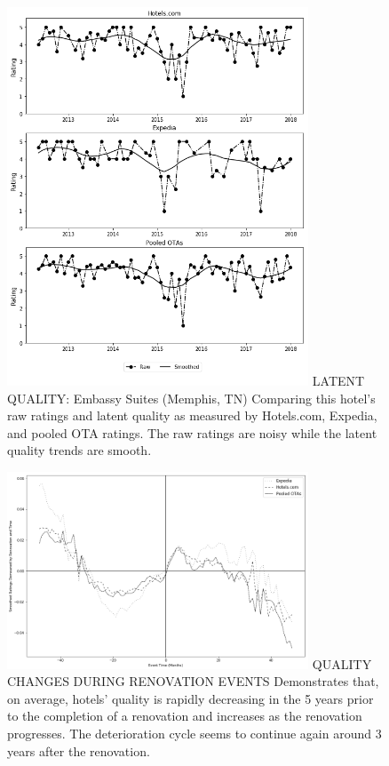 \documentclass{informs_mod} %
\begin{document}
\begin{figure}[htp]
\FIGURE
{\includegraphics[width=0.8\textwidth,height=\textheight,keepaspectratio]{./Figures/Smoothed_Qual_18987_v2.png}}
{LATENT QUALITY: Embassy Suites (Memphis, TN) \label{fig:latentqual}}
{Comparing this hotel's raw ratings and latent quality as measured by  Hotels.com,  Expedia,  and  pooled  OTA  ratings.  The raw  ratings  are  noisy  while the latent quality trends are smooth.}
\end{figure}
\clearpage

\begin{figure}[htp]
\FIGURE
{\includegraphics[width=0.8\textwidth,height=\textheight,keepaspectratio]{./Figures/Renovation_Event_dm_ym_event.png}}
{QUALITY CHANGES DURING RENOVATION EVENTS\label{fig:renovqual}}
{Demonstrates that, on average, hotels' quality is rapidly decreasing in the 5 years prior to the completion of a renovation and increases as the renovation progresses. The deterioration cycle seems to continue again around 3 years after the renovation.}
\end{figure}
\clearpage
\end{document}
